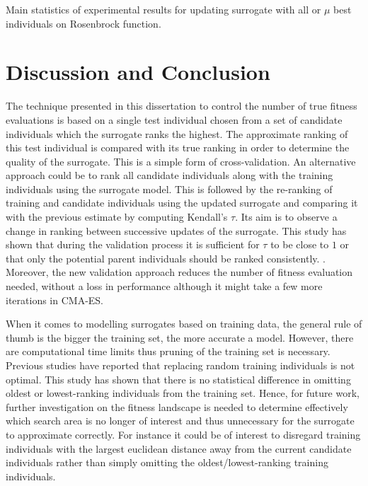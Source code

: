 \begin{table}\centering
	\caption{Main statistics of experimental results for updating surrogate with all or $\mu$ best individuals on Rosenbrock function.} \label{tbl:Rosenbrock}
	
\end{table}

\section{Discussion and Conclusion}\label{sec:sur:disc}
The technique presented in this dissertation to control the number of true fitness evaluations is based on a single test individual chosen from a set of candidate individuals which the surrogate ranks the highest. The approximate ranking of this test individual is compared with its true ranking in order to determine the quality of the surrogate. This is a simple form of cross-validation. An alternative approach could be to rank all candidate individuals along with the training individuals  using the surrogate model. This is followed by the re-ranking of training and candidate individuals using the updated surrogate and comparing it with the previous estimate by computing Kendall's $\tau$. Its aim is to observe a change in ranking between successive updates of the surrogate. This study has shown that during the validation process it is sufficient for $\tau$ to be close to $1$ or that only the potential parent individuals should be ranked consistently. .\\
Moreover, the new validation approach reduces the number of fitness evaluation needed, without a loss in performance although it might take a few more iterations in CMA-ES. 


When it comes to modelling surrogates based on training data, the general rule of thumb is the bigger the training set, the more accurate a model. However, there are computational time limits thus pruning of the training set is necessary. Previous studies \citep{Jin05,Ratle99} have reported that replacing random training individuals  is not optimal. This study has shown that there is no statistical difference in omitting oldest or lowest-ranking individuals  from the training set. Hence, for future work, further investigation on the fitness landscape is needed to determine effectively which search area is no longer of interest and thus unnecessary for the surrogate to approximate correctly. For instance it could be of interest to disregard training individuals  with the largest euclidean distance away from the current candidate individuals rather than simply omitting the oldest/lowest-ranking training individuals. 

